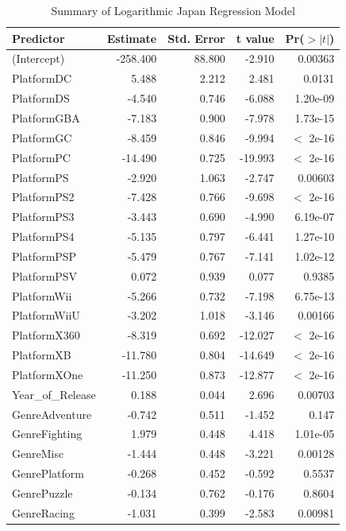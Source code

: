\documentclass[12pt]{article}
\begin{document}
\begin{table}[ht]
  \caption{Summary of Logarithmic Japan Regression Model}
  \label{tab:LogJP}
  \centering
  \begin{tabular}{lrrrr}
    \hline
    Predictor & Estimate & Std. Error & t value & Pr($>|t|$) \\
    \hline
    (Intercept) & -258.400 & 88.800 & -2.910 & 0.00363 \\
    PlatformDC & 5.488 & 2.212 & 2.481 & 0.0131 \\
    PlatformDS & -4.540 & 0.746 & -6.088 & 1.20e-09 \\
    PlatformGBA & -7.183 & 0.900 & -7.978 & 1.73e-15 \\
    PlatformGC & -8.459 & 0.846 & -9.994 & $<$ 2e-16 \\
    PlatformPC & -14.490 & 0.725 & -19.993 & $<$ 2e-16 \\
    PlatformPS & -2.920 & 1.063 & -2.747 & 0.00603 \\
    PlatformPS2 & -7.428 & 0.766 & -9.698 & $<$ 2e-16 \\
    PlatformPS3 & -3.443 & 0.690 & -4.990 & 6.19e-07 \\
    PlatformPS4 & -5.135 & 0.797 & -6.441 & 1.27e-10 \\
    PlatformPSP & -5.479 & 0.767 & -7.141 & 1.02e-12 \\
    PlatformPSV & 0.072 & 0.939 & 0.077 & 0.9385 \\
    PlatformWii & -5.266 & 0.732 & -7.198 & 6.75e-13 \\
    PlatformWiiU & -3.202 & 1.018 & -3.146 & 0.00166 \\
    PlatformX360 & -8.319 & 0.692 & -12.027 & $<$ 2e-16 \\
    PlatformXB & -11.780 & 0.804 & -14.649 & $<$ 2e-16 \\
    PlatformXOne & -11.250 & 0.873 & -12.877 & $<$ 2e-16 \\
    Year\_of\_Release & 0.188 & 0.044 & 2.696 & 0.00703 \\
    GenreAdventure & -0.742 & 0.511 & -1.452 & 0.147 \\
    GenreFighting & 1.979 & 0.448 & 4.418 & 1.01e-05 \\
    GenreMisc & -1.444 & 0.448 & -3.221 & 0.00128 \\
    GenrePlatform & -0.268 & 0.452 & -0.592 & 0.5537 \\
    GenrePuzzle & -0.134 & 0.762 & -0.176 & 0.8604 \\
    GenreRacing & -1.031 & 0.399 & -2.583 & 0.00981 \\

\end{tabular}
\end{table}
\end{document}
